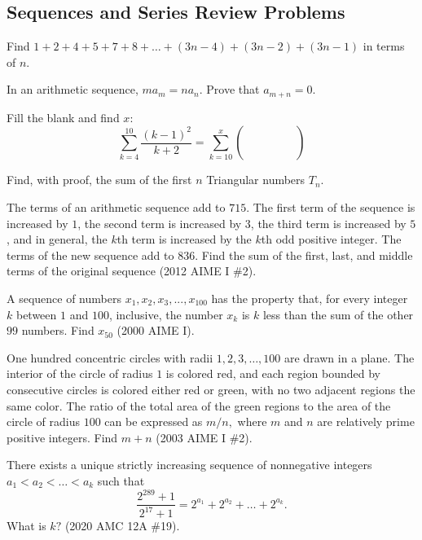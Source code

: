 \documentclass[11pt]{article}
\newcommand{\important}{$\blacktriangleright\,$}
\newlength\radius
\begin{document}
\subsection{Sequences and Series Review Problems}
\begin{problem}[10]
    Find $1 + 2 + 4 + 5 +7 + 8 + \dots  + (3n-4) + (3n-2) + (3n-1)$ in terms of $n$.
\end{problem}
\begin{problem}[\important 15]
    In an arithmetic sequence, $ma_m = na_n$. Prove that $a_{m+n} = 0$.
\end{problem}
\begin{problem}[\important 10]
    Fill the blank and find $x$: \[\sum_{k=4}^{10} \frac{(k-1)^2}{k+2} = \sum_{k=10}^{x}\left(\phantom{\frac{(k-1)^2}{k+2}}\right)\]
\end{problem}
\begin{problem}[15]
    Find, with proof, the sum of the first $n$ Triangular numbers $T_n$.
\end{problem}
\begin{problem}[25]
    The terms of an arithmetic sequence add to $715$. The first term of the sequence is increased by $1$, the second term is increased by $3$, the third term is increased by $5$, and in general, the $k$th term is increased by the $k$th odd positive integer. The terms of the new sequence add to $836$. Find the sum of the first, last, and middle terms of the original sequence (2012 AIME I \#2).
\end{problem}
\begin{problem}[25]
    A sequence of numbers $x_1, x_2, x_3,..., x_{100}$ has the property that, for every integer $k$ between $1$ and $100$, inclusive, the number $x_k$ is $k$ less than the sum of the other $99$ numbers. Find $x_{50}$ (2000 AIME I).
\end{problem}
\begin{problem}[25]
    One hundred concentric circles with radii $1, 2, 3, \dots, 100$ are drawn in a plane. The interior of the circle of radius $1$ is colored red, and each region bounded by consecutive circles is colored either red or green, with no two adjacent regions the same color. The ratio of the total area of the green regions to the area of the circle of radius $100$ can be expressed as $m/n,$ where $m$ and $n$ are relatively prime positive integers. Find $m + n$ (2003 AIME I \#2).
\end{problem}
\begin{problem}[35]
    There exists a unique strictly increasing sequence of nonnegative integers $a_1 < a_2 < … < a_k$ such that
    \[\frac{2^{289}+1}{2^{17}+1} = 2^{a_1} + 2^{a_2} + … + 2^{a_k}.\]
    What is $k?$ (2020 AMC 12A \#19).
\end{problem}
\end{document}
